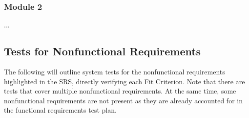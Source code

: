 \documentclass[12pt, titlepage]{article}
\begin{document}
\subsubsection{Module 2}

...

\subsection{Tests for Nonfunctional Requirements}

The following will outline system tests for the nonfunctional requirements highlighted in the SRS, directly verifying each Fit Criterion. Note that there are tests that cover multiple nonfunctional requirements. At the same time, some nonfunctional requirements are not present as they are already accounted for in the functional requirements test plan. 
\end{document}
